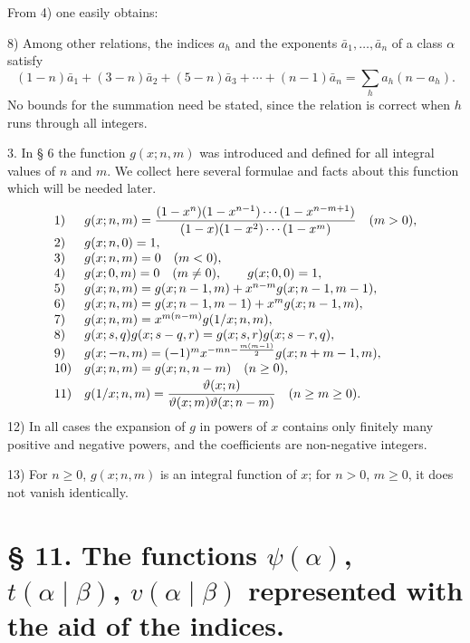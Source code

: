 From 4) one easily obtains:

8) Among other relations, the indices $a_h$ and the exponents $\bar a_1,
\ldots,\bar a_n$ of a class $\alpha$ satisfy
\begin{equation}
 (1-n)\bar a_1+(3-n)\bar a_2+(5-n)\bar a_3+\cdots+(n-1)\bar a_n
 =\sum_h a_h(n-a_h).
\tag{3}
\end{equation}
No bounds for the summation need be stated, since the relation is correct when $h$ runs through all integers.

3. In § 6 the function $g(x;n,m)$ was introduced and defined for all integral values of $n$ and $m$. We collect here several formulae and facts about this function which will be needed later.
\[
\begin{array}{ll}
1)&\displaystyle g(x;n,m)={ (1-x^n)(1-x^{n-1})\cdots(1-x^{n-m+1})\over(1-x)(1-x^2)\cdots(1-x^m)}\quad(m>0),\\[1.0ex]
2)&g(x;n,0)=1,\\
3)&g(x;n,m)=0\quad(m<0),\\
4)&g(x;0,m)=0\quad(m\ne0),\qquad g(x;0,0)=1,\\
5)&g(x;n,m)=g(x;n-1,m)+x^{n-m}g(x;n-1,m-1),\\
6)&g(x;n,m)=g(x;n-1,m-1)+x^m g(x;n-1,m),\\
7)&g(x;n,m)=x^{m(n-m)}g(1/x;n,m),\\
8)&g(x;s,q)g(x;s-q,r)=g(x;s,r)g(x;s-r,q),\\
9)&g(x;-n,m)=(-1)^m x^{-mn-{m(m-1)\over2}}g(x;n+m-1,m),\\
10)&g(x;n,m)=g(x;n,n-m)\quad(n\ge0),\\[0.5ex]
11)&\displaystyle g(1/x;n,m)={\vartheta(x;n)\over\vartheta(x;m)\vartheta(x;n-m)}\quad(n\ge m\ge0).
\end{array}
\]
12) In all cases the expansion of $g$ in powers of $x$ contains only finitely many positive and negative powers, and the coefficients are non-negative integers.

13) For $n\ge0$, $g(x;n,m)$ is an integral function of $x$; for $n>0$, $m\ge0$, it does not vanish identically.

\section*{§ 11. The functions $\psi(\alpha)$, $t(\alpha\mid\beta)$, $v(\alpha\mid\beta)$ represented with the aid of the indices.}

